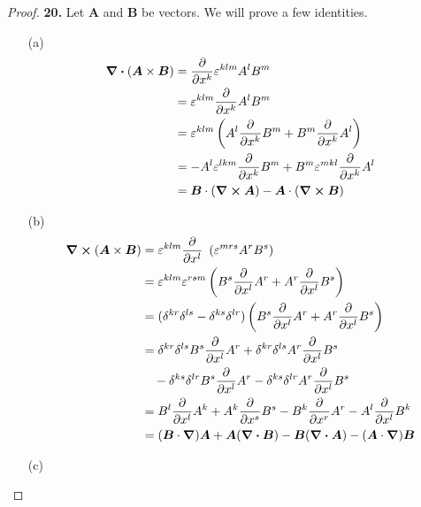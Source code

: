 \documentclass[11pt]{article}
\theoremstyle{definition}
\begin{document}
\cleardoublepage
\begin{proof}{\textbf{20.}} Let $\bm A$ and $\bm B$ be vectors.
    We will prove a few identities.
    \begin{itemize}
        \item [(a)]
        \begin{align*}
            \div (\bm{A} \times \bm{B}) &=
            \partialderivative{}{x^k}\varepsilon^{klm}A^lB^m\\
            &= \varepsilon^{klm}\partialderivative{}{x^k}A^lB^m\\
            &= \varepsilon^{klm}\left(A^l\partialderivative{}{x^k}B^m
            + B^m\partialderivative{}{x^k}A^l\right)\\
            &= -A^l\varepsilon^{lkm}\partialderivative{}{x^k}B^m
            + B^m\varepsilon^{mkl}\partialderivative{}{x^k}A^l\\
            &= \bm{B}\cdot(\curl \bm{A}) - \bm{A}\cdot(\curl \bm{B})
        \end{align*}
        \item [(b)]
        \begin{align*}
            \curl (\bm{A} \times \bm{B}) &=
            \varepsilon^{klm}\partialderivative{}{x^l}~\left(
                \varepsilon^{mrs}A^rB^s
            \right)\\
            &= \varepsilon^{klm}\varepsilon^{rsm}
            \left(
                B^s\partialderivative{}{x^l}A^r + A^r\partialderivative{}{x^l}B^s
            \right)\\
            &= (\delta^{kr}\delta^{ls} - \delta^{ks}\delta^{lr})
            \left(
                B^s\partialderivative{}{x^l}A^r + A^r\partialderivative{}{x^l}B^s
            \right)\\
            &= \delta^{kr}\delta^{ls}B^s\partialderivative{}{x^l}A^r
            + \delta^{kr}\delta^{ls}A^r\partialderivative{}{x^l}B^s\\
            &\quad- \delta^{ks}\delta^{lr}B^s\partialderivative{}{x^l}A^r
            - \delta^{ks}\delta^{lr}A^r\partialderivative{}{x^l}B^s\\
            &= B^l\partialderivative{}{x^l}A^k + A^k\partialderivative{}{x^s}B^s
            - B^k\partialderivative{}{x^r}A^r - A^l\partialderivative{}{x^l}B^k\\
            &= (\bm{B}\cdot\grad)\bm{A} + \bm{A}(\div\bm{B})
            - \bm{B}(\div \bm{A}) - (\bm{A}\cdot\grad)\bm{B}
        \end{align*}
        \item [(c)]

\end{itemize}
\end{proof}
\end{document}
